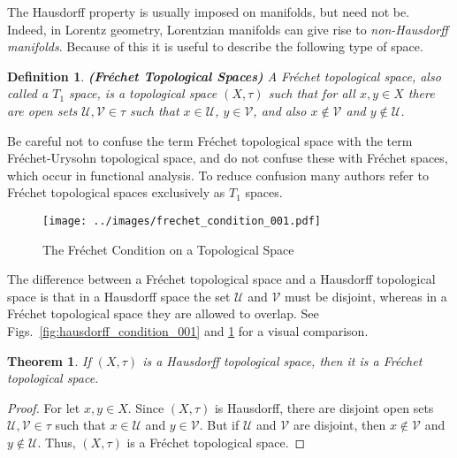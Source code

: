 \documentclass{article}
\theoremstyle{plain}
\newtheorem{theorem}{Theorem}[section]
\theoremstyle{normal}
\newtheorem{definition}{Definition}[section]
\begin{document}
        The Hausdorff property is usually imposed on manifolds, but need not be.
        Indeed, in Lorentz geometry, Lorentzian manifolds can give rise to
        \textit{non-Hausdorff manifolds}. Because of this it is useful to
        describe the following type of space.
        \begin{definition}{\textbf{(Fr\'{e}chet Topological Spaces)}}
            A Fr\'{e}chet topological space, also called a $T_{1}$ space, is a
            topological space $(X,\tau)$ such that for all $x,y\in{X}$ there
            are open sets $\mathcal{U},\mathcal{V}\in\tau$ such that
            $x\in\mathcal{U}$, $y\in\mathcal{V}$, and also $x\notin\mathcal{V}$
            and $y\notin\mathcal{U}$.
        \end{definition}
        Be careful not to confuse the term Fr\'{e}chet topological space with
        the term Fr\'{e}chet-Urysohn topological space, and do not confuse these
        with Fr\'{e}chet spaces, which occur in functional analysis. To reduce
        confusion many authors refer to Fr\'{e}chet topological spaces
        exclusively as $T_{1}$ spaces.
        \begin{figure}
            \centering
            \texttt{[image: ../images/frechet\_condition\_001.pdf]}
            \caption{The Fr\'{e}chet Condition on a Topological Space}
            \label{fig:frechet_condition_001}
        \end{figure}
        The difference between a Fr\'{e}chet topological space and a Hausdorff
        topological space is that in a Hausdorff space the set $\mathcal{U}$
        and $\mathcal{V}$ must be disjoint, whereas in a Fr\'{e}chet
        topological space they are allowed to overlap. See
        Figs.~\ref{fig:hausdorff_condition_001} and
        \ref{fig:frechet_condition_001} for a visual comparison.
        \begin{theorem}
            If $(X,\tau)$ is a Hausdorff topological space, then it is a
            Fr\'{e}chet topological space.
        \end{theorem}
        \begin{proof}
            For let $x,y\in{X}$. Since $(X,\tau)$ is Hausdorff, there are
            disjoint open sets $\mathcal{U},\mathcal{V}\in\tau$ such that
            $x\in\mathcal{U}$ and $y\in\mathcal{V}$. But if $\mathcal{U}$ and
            $\mathcal{V}$ are disjoint, then $x\notin\mathcal{V}$ and
            $y\notin\mathcal{U}$. Thus, $(X,\tau)$ is a Fr\'{e}chet topological
            space.
        \end{proof}
\end{document}
